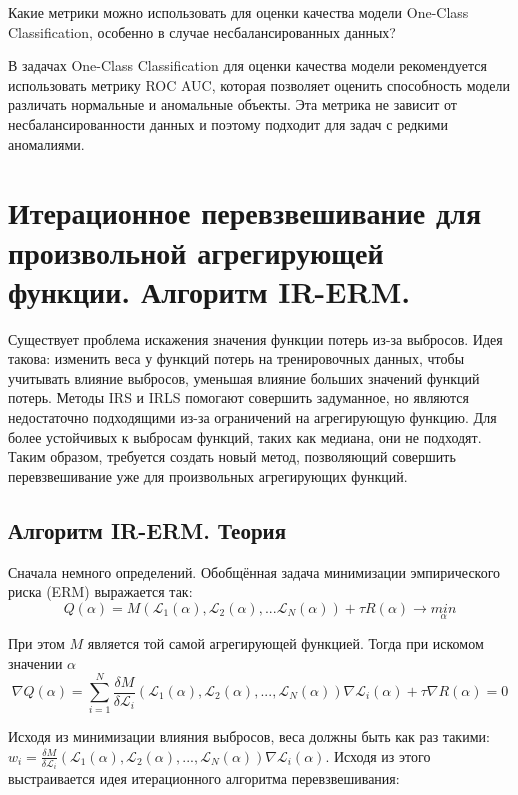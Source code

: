 \problem Какие метрики можно использовать для оценки качества модели One-Class Classification, особенно в случае несбалансированных данных?

\solution В задачах One-Class Classification для оценки качества модели рекомендуется использовать метрику ROC AUC, которая позволяет оценить способность модели различать нормальные и аномальные объекты. Эта метрика не зависит от несбалансированности данных и поэтому подходит для задач с редкими аномалиями.




\section{Итерационное перевзвешивание для произвольной агрегирующей функции. Алгоритм IR-ERM.}

Существует проблема искажения значения функции потерь из-за выбросов. Идея такова: изменить веса у функций потерь на тренировочных данных, чтобы учитывать влияние выбросов, уменьшая влияние больших значений функций потерь. Методы IRS и IRLS помогают совершить задуманное, но являются недостаточно подходящими из-за ограничений на агрегирующую функцию. Для более устойчивых к выбросам функций, таких как медиана, они не подходят. Таким образом, требуется создать новый метод, позволяющий совершить перевзвешивание уже для произвольных агрегирующих функций.

\subsection{Алгоритм IR-ERM. Теория}

Сначала немного определений. Обобщённая задача минимизации эмпирического риска (ERM) выражается так:
$$Q(\alpha) = M(\mathscr{L}_1(\alpha), \mathscr{L}_2(\alpha), ... \mathscr{L}_N(\alpha)) + \tau R(\alpha) \xrightarrow{} \underset{\alpha}{min}$$

При этом $M$ является той самой агрегирующей функцией. Тогда при искомом значении $\alpha$
$$\nabla Q(\alpha) = \sum_{i=1}^N \frac{\delta M}{\delta \mathscr{L}_i}(\mathscr{L}_1(\alpha), \mathscr{L}_2(\alpha), ..., \mathscr{L}_N(\alpha)) \nabla \mathscr{L}_i(\alpha) + \tau \nabla R(\alpha) = 0$$

Исходя из минимизации влияния выбросов, веса должны быть как раз такими: $w_i = \frac{\delta M}{\delta \mathscr{L}_i}(\mathscr{L}_1(\alpha), \mathscr{L}_2(\alpha), ..., \mathscr{L}_N(\alpha)) \nabla \mathscr{L}_i(\alpha)$. Исходя из этого выстраивается идея итерационного алгоритма перевзвешивания:

